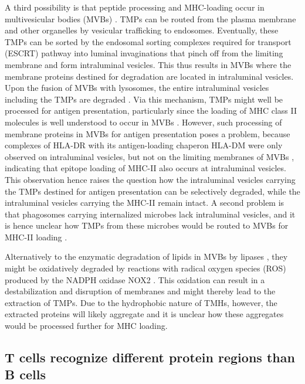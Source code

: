 A third possibility is that peptide processing and MHC-loading occur in multivesicular bodies (MVBs) \cite{oliveira2015alternative}. 
TMPs can be routed from the plasma membrane and other organelles by vesicular trafficking to endosomes. Eventually, these TMPs can be sorted by the endosomal sorting complexes required for transport (ESCRT) pathway into luminal invaginations that pinch off from the limiting membrane and form intraluminal vesicles. This thus results in MVBs where the membrane proteins destined for degradation are located in intraluminal vesicles. Upon the fusion of MVBs with lysosomes, 
the entire intraluminal vesicles including the TMPs are degraded \cite{gruenberg2020life}. 
Via this mechanism, TMPs might well be processed for antigen presentation, 
particularly since the loading of MHC class II molecules is well understood 
to occur in MVBs \cite{kleijmeer2001reorganization,peters1991segregation,zwart2005spatial}. 
However, such processing of membrane proteins in MVBs for antigen presentation poses a problem, because complexes of HLA-DR with its antigen-loading chaperon HLA-DM were only observed on intraluminal vesicles, 
but not on the limiting membranes of MVBs \cite{zwart2005spatial}, 
indicating that epitope loading of MHC-II also occurs at intraluminal vesicles. This observation hence raises the question how the intraluminal vesicles carrying the TMPs destined for antigen presentation can be selectively degraded, while the intraluminal vesicles carrying the MHC-II remain intact. A second problem is that phagosomes carrying internalized microbes lack intraluminal vesicles, 
and it is hence unclear how TMPs from these microbes 
would be routed to MVBs for MHC-II loading \cite{zwart2005spatial}.

Alternatively to the enzymatic degradation of lipids in MVBs by lipases \cite{sander2016lipase,gilleron2016lysosomal}, 
they might be oxidatively degraded by reactions with radical oxygen species (ROS) produced by the NADPH oxidase NOX2 \cite{dingjan2016lipid}. 
This oxidation can result in a destabilization and disruption of membranes \cite{dingjan2016lipid} 
and might thereby lead to the extraction of TMPs. 
Due to the hydrophobic nature of TMHs, 
however, the extracted proteins will likely aggregate 
and it is unclear how these aggregates would be processed further for MHC loading. 

\subsection{T cells recognize different protein regions than B cells}

